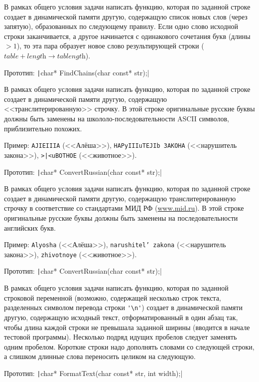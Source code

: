 \begin{zztask}
В рамках общего условия задачи написать функцию, которая по заданной строке
создает в динамической памяти другую, содержащую список новых слов (через
запятую), образованных по следующему правилу. Если одно слово исходной строки
заканчивается, а другое начинается с одинакового сочетания букв
(длины $> 1$), то эта пара образует новое слово результирующей строки
($\textit{table} + \textit{length} \rightarrow \textit{tablength}$).

Прототип: \texttt|char* FindChains(char const* str);|
\end{zztask}

\begin{zztask}
В рамках общего условия задачи написать функцию, которая по заданной строке
создает в динамической памяти другую, содержащую <<транслитерированную>>
строчку. В этой строке оригинальные русские буквы должны быть заменены на
школоло-последовательности ASCII символов, приблизительно похожих.

Пример:
\verb|AJIEIIIA| (<<Алёша>>), \verb|HAPyIIIuTEJIb 3AKOHA|
(<<нарушитель закона>>), \verb!>|<uBOTHOE! (<<животное>>).

Прототип: \texttt|char* ConvertRussian(char const* str);|
\end{zztask}

\begin{zztask}
В рамках общего условия задачи написать функцию, которая по заданной строке
создает в динамической памяти другую, содержащую транслитерированную
строчку в соответствие со стандартами МИД РФ (\url{www.mid.ru}).
В этой строке оригинальные русские буквы должны быть заменены на
последовательности английских букв.

Пример:
\texttt{Alyosha} (<<Алёша>>), \texttt{narushitel{'} zakona}
(<<нарушитель закона>>), \texttt{zhivotnoye} (<<животное>>).

Прототип: \texttt|char* ConvertRussian(char const* str);|
\end{zztask}

\begin{zztask}
В рамках общего условия задачи написать функцию, которая по заданной строковой
переменной (возможно, содержащей несколько строк текста, разделенных символом
перевода строки \verb|'\n'|) создает в динамической памяти другую, содержащую
исходный текст, отформатированный в один абзац так, чтобы длина каждой
строки не превышала заданной ширины (вводится в начале тестовой программы).
Несколько подряд идущих пробелов следует заменять одним пробелом.
Короткие строки надо дополнять словами со следующей строки, а слишком
длинные слова переносить целиком на следующую.

Прототип: \texttt|char* FormatText(char const* str, int width);|
\end{zztask}

